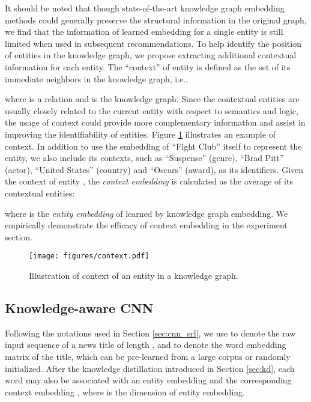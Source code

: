 \documentclass[sigconf]{acmart}
\begin{document}
		It should be noted that though state-of-the-art knowledge graph embedding methods could generally preserve the structural information in the original graph, we find that the information of learned embedding for a single entity is still limited when used in subsequent recommendations.
		To help identify the position of entities in the knowledge graph, we propose extracting additional contextual information for each entity.
		The ``context'' of entity  is defined as the set of its immediate neighbors in the knowledge graph, i.e.,
		
		where  is a relation and  is the knowledge graph.
		Since the contextual entities are usually closely related to the current entity with respect to semantics and logic, the usage of context could provide more complementary information and assist in improving the identifiability of entities.
		Figure \ref{fig:context} illustrates an example of context.
		In addition to use the embedding of ``\textsf{Fight Club}'' itself to represent the entity, we also include its contexts, such as ``\textsf{Suspense}'' (genre), ``\textsf{Brad Pitt}'' (actor), ``\textsf{United States}'' (country) and ``\textsf{Oscars}'' (award), as its identifiers.
		Given the context of entity , the \textit{context embedding} is calculated as the average of its contextual entities:
		
		where  is the \textit{entity embedding} of  learned by knowledge graph embedding.
		We empirically demonstrate the efficacy of context embedding in the experiment section.
		
		\begin{figure}[t]
			\centering
  			\texttt{[image: figures/context.pdf]}
  			\caption{Illustration of context of an entity in a knowledge graph.}
  			\label{fig:context}
		\end{figure}
		
		
	\subsection{Knowledge-aware CNN}
	\label{sec:kcnn}
		Following the notations used in Section \ref{sec:cnn_srl}, we use  to denote the raw input sequence of a news title  of length , and  to denote the word embedding matrix of the title, which can be pre-learned from a large corpus or randomly initialized.
		After the knowledge distillation introduced in Section \ref{sec:kd}, each word  may also be associated with an entity embedding  and the corresponding context embedding , where  is the dimension of entity embedding.
		
\end{document}

